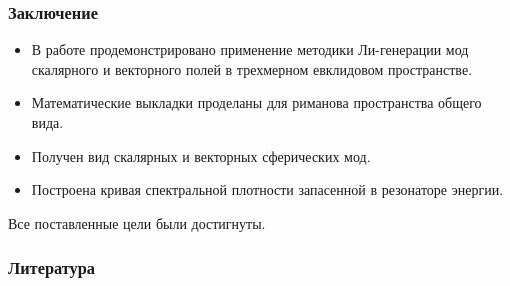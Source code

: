 \documentclass[compress]{beamer}
\begin{document}
    \begin{frame}\frametitle{Заключение}

        \begin{itemize}
            \item В работе продемонстрировано применение методики Ли-генерации мод скалярного и векторного полей в трехмерном евклидовом пространстве.

            \item Математические выкладки проделаны для риманова пространства общего вида.

            \item Получен вид скалярных и векторных сферических мод.

            \item Построена кривая спектральной плотности запасенной в резонаторе энергии.
        \end{itemize}

        Все поставленные цели были достигнуты.

    \end{frame}


    \begin{frame}\frametitle{Литература}
        
        
    \end{frame}
\end{document}
